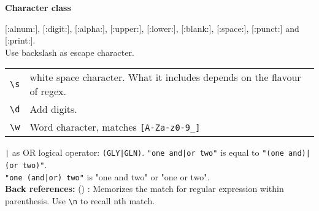 \textbf{Character class}

[:alnum:], [:digit:], [:alpha:], [:upper:], [:lower:], [:blank:], [:space:], [:punct:] and [:print:].\\

Use backslash as escape character. \\
    \begin{tabularx}{\linewidth}{lX}
    \texttt{\textbackslash s} & white space character. What it includes depends on the flavour of regex.\\
    \texttt{\textbackslash d} & Add digits.\\
    \texttt{\textbackslash w} & Word character, matches \texttt{[A-Za-z0-9\_]}\\
\end{tabularx}

\texttt{|} as OR logical operator: \texttt{(GLY|GLN)}.
\texttt{"one and|or two"} is equal to \texttt{"(one and)|(or two)"}.\\
\texttt{"one (and|or) two"} is "one and two" or "one or two".\\

\textbf{Back references:} () : Memorizes the match for regular expression within parenthesis. Use \texttt{\textbackslash n} to recall nth match.

\begin{tabularx}{\linewidth}{lX}
    \hline
\end{tabularx}

\vfill\null
\columnbreak

